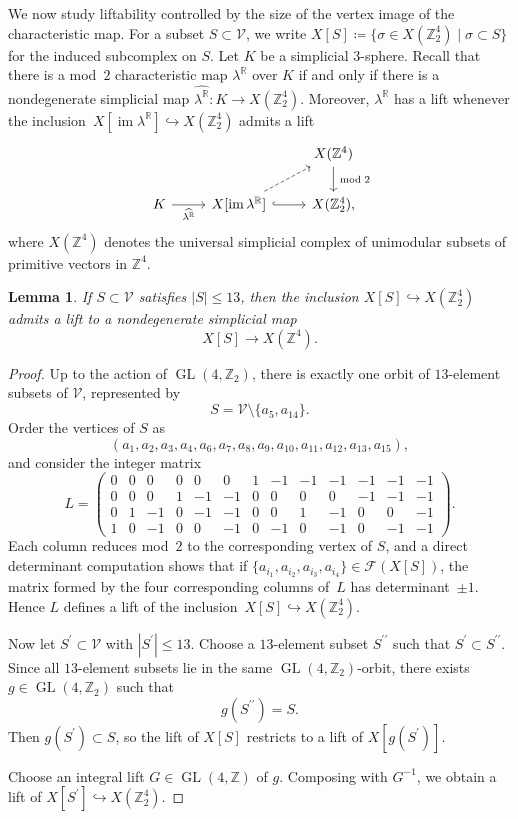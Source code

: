 \documentclass{amsart}
\newcommand{\Z}{\mathbb{Z}}
\newcommand{\R}{\mathbb{R}}
\newcommand{\cF}{\mathcal{F}}
\newcommand{\cV}{\mathcal{V}}
\DeclareMathOperator{\GL}{GL}
\DeclareMathOperator{\im}{im}
\newtheorem{lemma}[theorem]{Lemma}
\theoremstyle{definition}
\theoremstyle{remark}
\begin{document}
We now study liftability controlled by the size of the vertex image of the characteristic map.
For a subset $S\subset \cV$, we write $X[S]\coloneq\{\sigma\in X(\Z_2^4)\mid \sigma\subset S\}$ for the induced subcomplex on $S$.
Let $K$ be a simplicial $3$-sphere.
Recall that there is a mod~$2$ characteristic map $\lambda^\R$ over $K$ if and only if there is a nondegenerate simplicial map $\widehat{\lambda^\R}\colon K \to X(\Z_2^4)$.
Moreover, $\lambda^\R$ has a lift whenever the inclusion~$X[ \im \lambda^\R] \hookrightarrow X(\Z_2^4)$ admits a lift 
$$
    \begin{tikzcd}
        &  & X(\Z^4) \arrow[d, "\bmod 2"] \\
        K \arrow[r, "\widehat{\lambda^{\R}}"'] & X[ \im \lambda^\R] \arrow[ur, dashed] \arrow[r, hook] & X (\Z_2^4),
    \end{tikzcd}
$$
where $X(\Z^4)$ denotes the universal simplicial complex of unimodular subsets of primitive vectors in $\Z^4$.

\begin{lemma}\label{lem:qle13}
    If $S\subset \cV$ satisfies $|S|\leq 13$, then the inclusion $X[S]\hookrightarrow X(\Z_2^4)$ admits a lift to a nondegenerate simplicial map
    $$
        X[S]\longrightarrow X(\Z^4).
    $$
\end{lemma}
\begin{proof}
    Up to the action of $\GL(4,\Z_2)$, there is exactly one orbit of $13$-element subsets of $\cV$, represented by
    $$
        S=\cV\setminus\{a_5,a_{14}\}.
    $$
    Order the vertices of $S$ as
    $$
        (a_1,a_2,a_3,a_4,a_6,a_7,a_8,a_9,a_{10},a_{11},a_{12},a_{13},a_{15}),
    $$
    and consider the integer matrix
    $$
        L=\left(
            \begin{array}{ccccccccccccc}
                0&0&0&0&0&0&1&-1&-1&-1&-1&-1&-1\\
                0&0&0&1&-1&-1&0&0&0&0&-1&-1&-1\\
                0&1&-1&0&-1&-1&0&0&1&-1&0&0&-1\\
                1&0&-1&0&0&-1&0&-1&0&-1&0&-1&-1
            \end{array}\right).
    $$
    Each column reduces mod~$2$ to the corresponding vertex of $S$, and a direct determinant computation shows that if $\{a_{i_1}, a_{i_2}, a_{i_3}, a_{i_4}\}\in \cF(X[S])$, the matrix formed by the four corresponding columns of~$L$ has determinant~$\pm1$. 
    Hence $L$ defines a lift of the inclusion~$X[S] \hookrightarrow X(\Z_2^4)$.

    Now let $S^\prime\subset \cV$ with $|S^\prime|\le 13$.
    Choose a $13$-element subset $S^{\prime\prime}$ such that $S^\prime\subset S^{\prime\prime}$.
    Since all $13$-element subsets lie in the same $\GL(4,\Z_2)$-orbit, there exists $g\in \GL(4,\Z_2)$ such that
    $$
        g(S^{\prime\prime})=S.
    $$
    Then $g(S^\prime)\subset S$, so the lift of $X[S]$ restricts to a lift of $X[g(S^\prime)]$.
    
    Choose an integral lift $G \in \GL(4,\Z)$ of $g$.
    Composing with $G^{-1}$, we obtain a lift of $X[S^\prime] \hookrightarrow X(\Z_2^4)$.
\end{proof}
\end{document}
